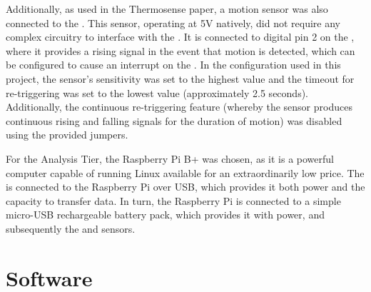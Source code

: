 \documentclass[../thesis/thesis.tex]{subfiles}
\begin{document}
Additionally, as used in the Thermosense paper, a \pir motion sensor \cite{AdafruitPIR} was also connected to the \ard. This sensor, operating at 5V natively, did not require any complex circuitry to interface with the \ard. It is connected to digital pin 2 on the \ard, where it provides a rising signal in the event that motion is detected, which can be configured to cause an interrupt on the \ard. In the configuration used in this project, the sensor's sensitivity was set to the highest value and the timeout for re-triggering was set to the lowest value (approximately 2.5 seconds). Additionally, the continuous re-triggering feature (whereby the sensor produces continuous rising and falling signals for the duration of motion) was disabled using the provided jumpers. 


For the Analysis Tier, the Raspberry Pi B+ was chosen, as it is a powerful computer capable of running Linux available for an extraordinarily low price. The \ard is connected to the Raspberry Pi over USB, which provides it both power and the capacity to transfer data. In turn, the Raspberry Pi is connected to a simple micro-USB rechargeable battery pack, which provides it with power, and subsequently the \ard and sensors.

\section{Software}
\end{document}
